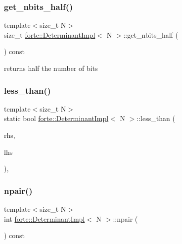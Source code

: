 \subsubsection{\texorpdfstring{get\+\_\+nbits\+\_\+half()}{get\_nbits\_half()}}
{\footnotesize\ttfamily template$<$size\+\_\+t N$>$ \\
size\+\_\+t \mbox{\hyperlink{classforte_1_1_determinant_impl}{forte\+::\+Determinant\+Impl}}$<$ N $>$\+::get\+\_\+nbits\+\_\+half (\begin{DoxyParamCaption}{ }\end{DoxyParamCaption}) const\hspace{0.3cm}{\ttfamily [inline]}}



returns half the number of bits 

\mbox{\label{classforte_1_1_determinant_impl_afa56e1f10e5d64c959ff0257a9ee8eb0}} 
\subsubsection{\texorpdfstring{less\+\_\+than()}{less\_than()}}
{\footnotesize\ttfamily template$<$size\+\_\+t N$>$ \\
static bool \mbox{\hyperlink{classforte_1_1_determinant_impl}{forte\+::\+Determinant\+Impl}}$<$ N $>$\+::less\+\_\+than (\begin{DoxyParamCaption}\item[{const \mbox{\hyperlink{classforte_1_1_determinant_impl}{Determinant\+Impl}}$<$ N $>$ \&}]{rhs,  }\item[{const \mbox{\hyperlink{classforte_1_1_determinant_impl}{Determinant\+Impl}}$<$ N $>$ \&}]{lhs }\end{DoxyParamCaption})\hspace{0.3cm}{\ttfamily [inline]}, {\ttfamily [static]}}

\mbox{\label{classforte_1_1_determinant_impl_ae08fd0456249dc605ba10b095afc2549}} 
\subsubsection{\texorpdfstring{npair()}{npair()}}
{\footnotesize\ttfamily template$<$size\+\_\+t N$>$ \\
int \mbox{\hyperlink{classforte_1_1_determinant_impl}{forte\+::\+Determinant\+Impl}}$<$ N $>$\+::npair (\begin{DoxyParamCaption}{ }\end{DoxyParamCaption}) const\hspace{0.3cm}{\ttfamily [inline]}}



